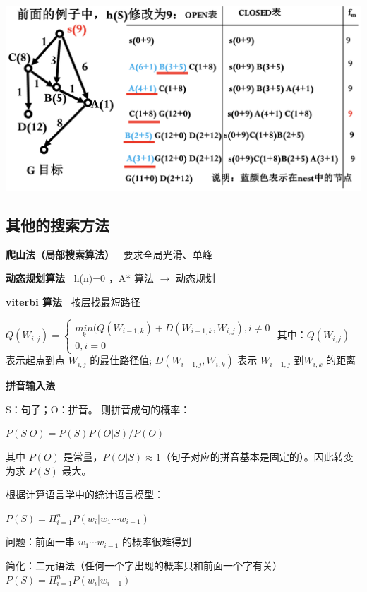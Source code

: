 \documentclass[b4paper, 10pt]{ctexart}
\makeatletter
\newenvironment{figurehere}
{\def\@captype{figure}}
{}
\makeatother
\begin{document}
\begin{multicols}{3}
\begin{figurehere}
    \centering    \includegraphics[width=0.95\linewidth]{figs/A-modified.png}
    \label{fig:A-algo-modified}
\end{figurehere}

\subsection{其他的搜索方法}
\textbf{爬山法（局部搜索算法）\ } 要求全局光滑、单峰


\textbf{动态规划算法\ }  h(n)=0 ，A* 算法 $\to$ 动态规划

\textbf{viterbi 算法\ } 按层找最短路径

$
Q(W_{i,j}) = 
\begin{cases}
\underset{k}{min}(Q(W_{i-1,k})+D(W_{i-1,k},W_{i,j}), i\ne 0\\
0,i=0
\end{cases}
$
其中：$Q(W_{i,j})$ 表示起点到点 $W_{i,j}$ 的最佳路径值; $D(W_{i-1,j}, W_{i,k})$ 表示 $W_{i-1,j}$ 到$W_{i,k}$ 的距离

\textbf{拼音输入法\ }

S：句子；O：拼音。
则拼音成句的概率：

\quad
$
P(S|O) = P(S)P(O|S)/P(O)
$

其中 $P(O)$ 是常量，$P(O|S)\approx 1$（句子对应的拼音基本是固定的）。因此转变为求 $P(S)$ 最大。

根据计算语言学中的统计语言模型：

\quad
$
P(S) = \Pi_{i=1}^n P(w_i|w_1\cdots w_{i-1})
$

问题：前面一串 $w_1\cdots w_{i-1}$ 的概率很难得到

简化：二元语法（任何一个字出现的概率只和前面一个字有关）
$
P(S) = \Pi_{i=1}^n P(w_i|w_{i-1})
$


\end{multicols}
\end{document}
